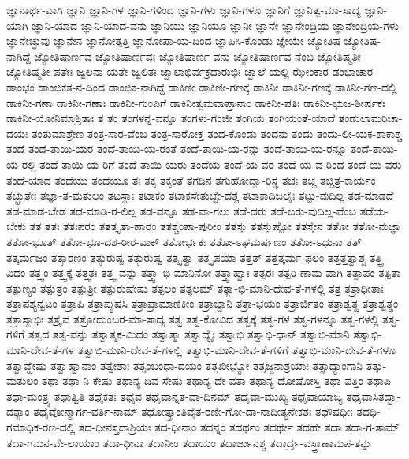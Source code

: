 {ಜ್ಞಾನಾರ್ಥ-ವಾಗಿ
ಜ್ಞಾನಿ
ಜ್ಞಾನಿ-ಗಳ
ಜ್ಞಾನಿ-ಗಳಿಂದ
ಜ್ಞಾನಿ-ಗಳು
ಜ್ಞಾನಿ-ಗಳೂ
ಜ್ಞಾನಿಗೆ
ಜ್ಞಾನಿತ್ವ-ಮಾ-ಸಾದ್ಯ
ಜ್ಞಾನಿ-ಯಾಗಿ
ಜ್ಞಾನಿ-ಯಾದ
ಜ್ಞಾನಿ-ಯಾದ-ವನು
ಜ್ಞಾನಿಯು
ಜ್ಞಾನಿಯೂ
ಜ್ಞಾನೀ
ಜ್ಞಾನೇ
ಜ್ಞಾನೇಂದ್ರಿಯ
ಜ್ಞಾನೇಂದ್ರಿಯ-ಗಳು
ಜ್ಞಾನೇಚ್ಛುವು
ಜ್ಞಾನೇನ
ಜ್ಞಾನೋತ್ಪತ್ತಿ
ಜ್ಞಾನೋಪಾ-ಯ-ದಿಂದ
ಜ್ಞಾಪಿಸಿ-ಕೊಂಡು
ಜ್ಞೇಯೇ
ಜ್ಯೋತಿಷ
ಜ್ಯೋತಿಷ-ನಾಗಿದ್ದೆ
ಜ್ಯೋತಿಷಾರ್ಣವ
ಜ್ಯೋತಿಷಾರ್ಣವಃ
ಜ್ಯೋತಿಷಾರ್ಣ-ವನು
ಜ್ಯೋತಿಷಾರ್ಣವ-ನೆಂಬ
ಜ್ಯೋತಿಷ್ಮತೀ
ಜ್ಯೋತಿಷ್ಮತೀ-ಪತೇಃ
ಜ್ವಲನಾ-ಯತೇ
ಜ್ವಲಿತಃ
ಜ್ವಾಲಾಭಿರ್ವಕ್ರದಾರುಭಿಃ
ಜ್ವಾಲೆ-ಯಲ್ಲಿ
ಝೇಂಕಾರ
ಡಂಭಾಚಾರ
ಡಾಂಭಂ
ಡಾಂಭಿಕತ-ನ-ದಿಂದ
ಡಾಂಭಿಕ-ನಾಗಿದ್ದೆ
ಡಾಕಿಣೀ
ಡಾಕಿಣೀ-ಗಣಕ್ಕೆ
ಡಾಕಿನೀ
ಡಾಕಿನೀ-ಗಣಕ್ಕೆ
ಡಾಕಿನೀ-ಗಣ-ದಲ್ಲಿ
ಡಾಕಿನೀ-ಗಣಾ
ಡಾಕಿನೀ-ಗಣಾಃ
ಡಾಕಿನೀ-ಗುಂಪಿಗೆ
ಡಾಕಿನೀತ್ವಮವಾಪ್ತಾನಾಂ
ಡಾಕಿನೀ-ಪತಿಃ
ಡಾಕಿನೀ-ಭುಜ-ಶೀರ್ಷಕಃ
ಡಾಕಿನೀ-ಯೋನಿಮಾಶ್ರಿತಾಃ
ತ
ತಂ
ತಂಗಳನ್ನ-ವನ್ನೂ
ತಂಗಳು-ಗಂಜೀ
ತಂಗಿಯ
ತಂಗಿಯಂತೆ-ಯಾದೆ
ತಂಡುಲಾಮರಿಚಾ-ದಯಃ
ತಂತುಮಾಶ್ರೇಣ
ತಂತ್ರ-ಸಾರ-ವೆಂಬ
ತಂತ್ರ-ಸಾರೋಕ್ತ
ತಂದ-ಕೊಂಡು
ತಂದನು
ತಂದು
ತಂದು-ಲೀ-ಯಕ-ಶಾಕಾಶ್ಚ
ತಂದೆ
ತಂದೆ-ತಾಯಿ-ಯರ
ತಂದೆ-ತಾಯಿ-ಯ-ರಂತೆ
ತಂದೆ-ತಾಯಿ-ಯ-ರನ್ನು
ತಂದೆ-ತಾಯಿ-ಯ-ರನ್ನೂ
ತಂದೆ-ತಾಯಿ-ಯ-ರಲ್ಲಿ
ತಂದೆ-ತಾಯಿ-ಯ-ರಿಗೆ
ತಂದೆ-ತಾಯಿ-ಯರು
ತಂದೆಯ
ತಂದೆ-ಯ-ವರ
ತಂದೆ-ಯ-ವ-ರಿಂದ
ತಂದೆ-ಯ-ವರು
ತಂದೆ-ಯಾದ
ತಂದೆಯು
ತಂದೆಯೂ
ತಃ
ತಕ್ಕ
ತಕ್ಕಂತೆ
ತಗಡಿನ
ತಗುಹೋದ್ವಾ-ರಿಸ್ಥ
ತಚಃ
ತಚ್ಚ
ತಚ್ಚಿತ್ರ-ಕಾರ್ಯಂ
ತಚ್ಛ್ರುತೇಃ
ತಜ್ಞಾ-ತ-ಮತುಲಂ
ತಟಸ್ಥಾಃ
ತಟಾಕಂ
ತಟಾಕಸೇತುಚ್ಛೇ-ದಶ್ಚ
ತಟಾಕಾದಿಜಲೈಃ
ತಟ್ಟು-ವುದಿಲ್ಲ
ತಡ-ಮಾಡದೆ
ತಡ-ಮಾಡ-ಬೇಡ
ತಡ-ಮಾಡಿ-ರ-ಲಿಲ್ಲ
ತಡ-ವನ್ನೂ
ತಡ-ವಾ-ಗಲು
ತಡೆ-ದರು
ತಡೆ-ಬರು-ವುದಿಲ್ಲ-ವೆಂಬ
ತಡೆಯ-ಬೇಕು
ತತ
ತತಃ
ತತಃಪರಂ
ತತತ್ಕೃತಾ-ಹಾರಂ
ತತಶ್ಚಂಪಾ-ಪುರೀಂ
ತತಸ್ತು
ತತಸ್ತುಷ್ಟೋ
ತತಸ್ತೇನ
ತತೋ
ತತೋ-ನುಜ್ಞಾ
ತತೋ-ಭೂತ್
ತತೋ-ಭೂ-ದಶ-ರೀರ-ವಾಕ್
ತತೋರ್ಭಕಃ
ತತೋ-ಽಘಮರ್ಷಣಂ
ತತೋ-ಽಧುನಾ
ತತ್
ತತ್ಕರ್ಮಜಂ
ತತ್ಕಾರಣಂ
ತತ್ಕುರುಷ್ಟ
ತತ್ಕುರುಷ್ವ
ತತ್ಕೃತ್ವಾ
ತತ್ಕೃಪಯಾ
ತತ್ತತ್
ತತ್ತತ್ಕರ್ಮ-ಫಲಂ
ತತ್ತತ್ತತ್ವಾಶ್ಚ
ತತ್ತ್ರಿ-ವಿಧಂ
ತತ್ತ್ವಂ
ತತ್ತ್ವಕ್ಕೆ
ತತ್ತ್ವತಃ
ತತ್ತ್ವ-ವನ್ನು
ತತ್ತ್ವಾ-ಭಿ-ಮಾನಿನೋ
ತತ್ತ್ವಾಹ್ವಾಃ
ತತ್ಪರಃ
ತತ್ಪರಿ-ಣಾಮ-ವಾಗಿ
ತತ್ಪಾಪಂ
ತತ್ಪಿತಾ
ತತ್ಪುಣ್ಯಂ
ತತ್ಪುತ್ರಂ
ತತ್ಪುತ್ರೀ
ತತ್ಪುರುಷೇಷು
ತತ್ಫಲಂ
ತತ್ಫಲಮ್
ತತ್ಯಾ-ಭಿ-ಮಾನಿ-ದೇವ-ತೆ-ಗಳಲ್ಲಿ
ತತ್ರ
ತತ್ರಾಧೀತಾಃ
ತತ್ರಾಪಶ್ಯನ್ವಟಂ
ತತ್ರಾಪಿ
ತತ್ರಾಪ್ಯುಷಸಿ
ತತ್ರಾಪ್ರಾಮಾಣಿಕೀಂ
ತತ್ರಾಬ್ದಾನಿ
ತತ್ರಾ-ಭಯಂ
ತತ್ರಾರ್ಜಿತಂ
ತತ್ರಾಶ್ವತ್ಥ
ತತ್ರಾಶ್ವತ್ಥಂ
ತತ್ರಾಸ್ಮಾಭಿಃ
ತತ್ರೈವ
ತತ್ರೋದುಂಬರ-ಮಾ-ಸಾದ್ಯ
ತತ್ವ
ತತ್ವ-ಕೋವಿದ
ತತ್ವಕ್ಕೆ
ತತ್ವ-ಗಳ
ತತ್ವ-ಗಳನ್ನೂ
ತತ್ವ-ಗಳಲ್ಲಿ
ತತ್ವ-ಗಳಿಗೆ
ತತ್ವದ
ತತ್ವ-ವನ್ನು
ತತ್ವಾತ್ಮಕ-ಮಿದಂ
ತತ್ವಾತ್ಮಾ
ತತ್ವಾದ್ಯೈಃ
ತತ್ವಾಭಿ
ತತ್ವಾಭಿ-ಧಾನ್
ತತ್ವಾಭಿ-ಮಾನಿ
ತತ್ವಾಭಿ-ಮಾನಿ-ದೇವ-ತೆ-ಗಳ
ತತ್ವಾಭಿ-ಮಾನಿ-ದೇವ-ತೆ-ಗಳಲ್ಲಿ
ತತ್ವಾಭಿ-ಮಾನಿ-ದೇವ-ತೆ-ಗಳಿಗೆ
ತತ್ವಾಭಿ-ಮಾನಿ-ದೇವ-ತೆ-ಗಳೂ
ತತ್ವಾವ್ಹೇಷು
ತತ್ವಾಹ್ವಾನಾಂ
ತತ್ವೇಶಾಃ
ತತ್ಸಂಬಂಧಾ-ದಯಂ
ತತ್ಸಖೀಭ್ಯೋ
ತತ್ಸಜ್ಜನಾಶ್ರಯಾಃ
ತತ್ಸಾಧ್ಯಾಂಗಾನಿ
ತತ್ಸು-ಮತುಲಂ
ತಥಾ
ತಥಾ-ನಿ-ಕೇಷು
ತಥಾನ್ಯ-ದಿವ-ಸೇಷು
ತಥಾನ್ಯ-ದೇ-ವತಾ
ತಥಾನ್ಯ-ದೋಷೋಸ್ತಿ
ತಥಾ-ಪತ್ತಿಂ
ತಥಾಪಿ
ತಥಾ-ಮಂತ್ರ್ಯ
ತಥಾತ್ವಿತಿ
ತಥೈಕತಃ
ತಥೈವ
ತಥೈವಾನ್ನತ-ವಾ-ದಿನಮ್
ತಥೈವಾ-ಮುಖ್ಯ
ತಥೈವಾಯಾಜ್ಯ
ತಥೈವಾಸಿತದ್ವಾ-ದಶ್ಯಾಂ
ತಥೈವೋನ್ಮಾರ್ಗ-ವರ್ತಿ-ನಾಮ್
ತಥೋತ್ಕ್ರಾಂತಿವೈತ-ರಣೀ-ಗೋ-ದಾ-ನಾದೀತ್ಯನೇಕಶಃ
ತಥೌಷಧೀಃ
ತದಧಿ-ಗಮಾಧಿಕ-ರಣ-ದಲ್ಲಿ
ತದ-ಧೀನಸ್ತದಾಶ್ರಿಯಃ
ತದ-ಧೀನಾಂ
ತದನ್ನಂ
ತದರ್ಥಂ
ತದರ್ಥೇ
ತದಹೇ
ತದಾ
ತದಾ-ಗ-ತಾಮ್
ತದಾ-ಗಮನ-ವೇ-ಲಾಯಾಂ
ತದಾ-ಧೀನಾ
ತದಾನೀಂ
ತದಾಯಂ
ತದಾರ್ಜುನಶ್ಚ
ತದಾರ್ದ್ರ-ವಸ್ತ್ರಾಣಾಮಪ-ತನ್ನು
}
